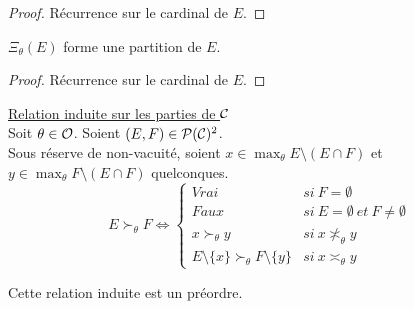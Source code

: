 \begin{proof}
	Récurrence sur le cardinal de $E$.
\end{proof}

\begin{proposition}
	$\varXi_\theta(E)$ forme une partition de $E$.
\end{proposition}

\begin{proof}
	Récurrence sur le cardinal de $E$.
\end{proof}


\begin{definition}
	\underline{Relation induite sur les parties de $\mathcal{C}$} \\
	Soit $\theta \in \mathcal{O}$. Soient $(E, F) \in \mathcal{P}(\mathcal{C})^2$. \\
	Sous réserve de non-vacuité, soient $x \in \max_\theta E \setminus (E \cap F)$ et $y \in \max_\theta F \setminus (E \cap F)$ quelconques.
	\begin{equation}
		E \succ_\theta F \iff
		\left\{ \begin{matrix}
			Vrai &si \ F = \emptyset \\
			Faux &si \ E = \emptyset \ et \ F \neq \emptyset \\
			x \succ_\theta y &si \ x \not \asymp_\theta y \\
			E \!\setminus\! \{x\} \succ_\theta F \!\setminus\! \{y\} &si \ x \asymp_\theta y
		\end{matrix} \right.
	\end{equation}
\end{definition}

\begin{proposition}
	Cette relation induite est un préordre.
\end{proposition}

